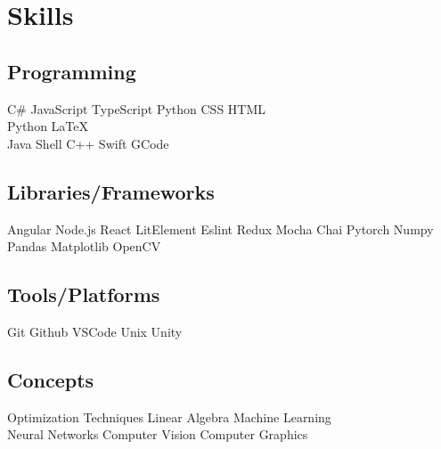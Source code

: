 \documentclass[]{plushcv}
\begin{document}
\hfill
\begin{minipage}[t]{0.25\textwidth}


    \section{Skills}
    \subsection{Programming}
    \sectionsep
    C\# \textbullet{} JavaScript \textbullet{} TypeScript
    \textbullet{} Python \textbullet{} CSS \textbullet{}
    HTML \textbullet{} \\
    \sectionsep
    Python \textbullet{} \LaTeX\ \textbullet{} \\
    \sectionsep
    Java \textbullet{}  Shell \textbullet{} C++ \textbullet{} Swift \textbullet{} GCode\\
    \sectionsep
    \sectionsep
    \subsection{Libraries/Frameworks}
    \sectionsep
    Angular \textbullet{} Node.js \textbullet{}
    React \textbullet{} LitElement \textbullet{}
    Eslint \textbullet{} Redux \textbullet{}
    Mocha \textbullet{} Chai  \textbullet{} Pytorch 
    \textbullet{} Numpy \textbullet{} Pandas
    \textbullet{} Matplotlib \textbullet{} OpenCV
    \\
    \sectionsep
    \sectionsep
    \subsection{Tools/Platforms}
    \sectionsep
    Git \textbullet{} Github \textbullet{}
    VSCode \textbullet{}  Unix \textbullet{}
    Unity 
    \\
    \sectionsep
    \sectionsep
    \subsection{Concepts}
    \sectionsep
    Optimization Techniques \textbullet{} Linear Algebra \textbullet{}
    Machine Learning \textbullet{} \\ Neural Networks \textbullet{}
    Computer Vision \textbullet{} Computer Graphics
    \sectionsep


\end{minipage}
\end{document}
